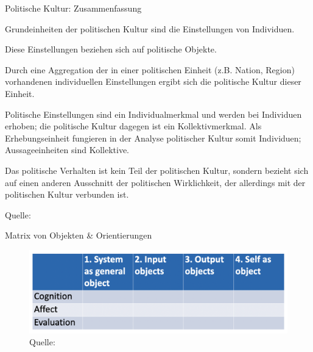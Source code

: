\documentclass[11pt]{beamer}
\begin{document}

\begin{frame}[t]{Politische Kultur: Zusammenfassung}
	\begin{nolist}
		\item Grundeinheiten der politischen Kultur sind die Einstellungen von Individuen.
		\item Diese Einstellungen beziehen sich auf politische Objekte.
		\item Durch eine Aggregation der in einer politischen Einheit (z.B. Nation, Region) vorhandenen individuellen Einstellungen ergibt sich die politische Kultur dieser Einheit.
		\item Politische Einstellungen sind ein Individualmerkmal und werden bei Individuen erhoben; die politische Kultur dagegen ist ein Kollektivmerkmal. Als Erhebungseinheit fungieren in der Analyse politischer Kultur somit Individuen; Aussageeinheiten sind Kollektive.
		\item Das politische Verhalten ist kein Teil der politischen Kultur, sondern bezieht sich auf einen anderen Ausschnitt der politischen Wirklichkeit, der allerdings mit der politischen Kultur verbunden ist.
	\end{nolist}
	
	Quelle: \cite[402]{Gabriel2009}
\end{frame}


\begin{frame}[t]{Matrix von Objekten \& Orientierungen}
	\begin{figure}[ht]
		\includegraphics[width=\textwidth]{pics/s3-3.png}
		\caption{Quelle: \cite[16]{Almond1963}}
	\end{figure}

\end{frame}
\end{document}
